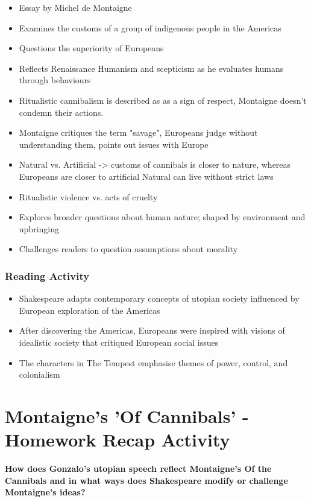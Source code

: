 			\begin{itemize}
				\item Essay by Michel de Montaigne
				\item Examines the customs of a group of indigenous people in the Americas
				\item Questions the superiority of Europeans
				\item Reflects Renaissance Humanism and scepticism as he evaluates humans through behaviours
				\item Ritualistic cannibalism is described as as a sign of respect, Montaigne doesn't condemn their actions.
				\item Montaigne critiques the term "savage", Europeans judge without understanding them, points out issues with Europe
				\item Natural vs. Artificial -> customs of cannibals is closer to nature, whereas Europeans are closer to artificial
					\subitem Natural can live without strict laws
				\item Ritualistic violence vs. acts of cruelty
				\item Explores broader questions about human nature; shaped by environment and upbringing
				\item Challenges readers to question assumptions about morality
			\end{itemize}

		\subsubsection{Reading Activity}
		
			\begin{itemize}
				\item Shakespeare adapts contemporary concepts of utopian society influenced by European exploration of the Americas
				\item After discovering the Americas, Europeans were inspired with visions of idealistic society that critiqued European social issues
				\item The characters in The Tempest emphasise themes of power, control, and colonialism
			\end{itemize}

\section{Montaigne's 'Of Cannibals' - Homework Recap Activity} \label{25/02/2025}

	\textbf{How does Gonzalo’s utopian speech reflect Montaigne’s Of the Cannibals and in what ways does Shakespeare modify or challenge Montaigne’s ideas?}

